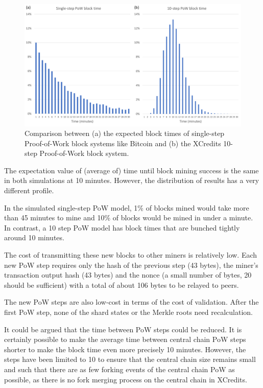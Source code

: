 \documentclass[a4paper,12pt]{article}
\begin{document}
\begin{figure}[!htb]
  \centering
  \includegraphics[page=1,width=.95\textwidth]{multi-step-pow} 
  \caption{Comparison between (a) the expected block times of single-step 
    Proof-of-Work block systems like Bitcoin and (b) the XCredits 10-step 
    Proof-of-Work block system. }
  \label{fig:multi-step-pow}
\end{figure}
\FloatBarrier

The expectation value of (average of) time until block mining success is the same in both simulations at 10 minutes. However, the distribution of results has a very different profile. 

In the simulated single-step PoW model, 1\% of blocks mined would take more than 45 minutes to mine and 10\% of blocks would be mined in under a minute. In contrast, a 10 step PoW model has block times that are bunched tightly around 10 minutes.



The cost of transmitting these new blocks to other miners is relatively low. Each new PoW step requires only the hash of the previous step (43 bytes), the miner's transaction output hash (43 bytes) and the nonce (a small number of bytes, 20 should be sufficient) with a total of about 106 bytes to be relayed to peers.

The new PoW steps are also low-cost in terms of the cost of validation. After the first PoW step, none of the shard states or the Merkle roots need recalculation.

It could be argued that the time between PoW steps could be reduced. It is certainly possible to make the average time between central chain PoW steps shorter to make the block time even more precisely 10 minutes. However, the steps have been limited to 10 to ensure that the central chain size remains small and such that there are as few forking events of the central chain PoW as possible, as there is no fork merging process on the central chain in XCredits.
\end{document}
